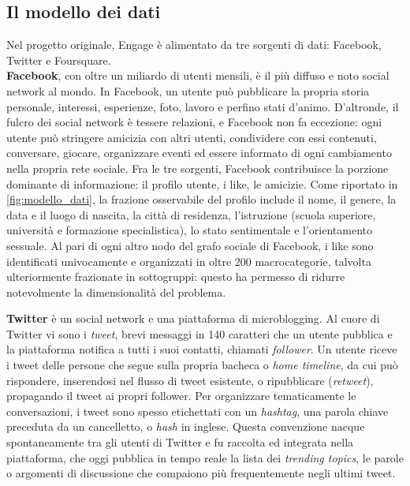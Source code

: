 \subsection{Il modello dei dati}
Nel progetto originale, Engage \`e alimentato da tre sorgenti di dati: Facebook, Twitter e Foursquare.\\
\textbf{Facebook}, con oltre un miliardo di utenti mensili, \`e il pi\`u diffuso e noto social network al mondo. In Facebook, un utente pu\`o pubblicare la propria storia personale, interessi, esperienze, foto, lavoro e perfino stati d'animo. D'altronde, il fulcro dei social network \`e tessere relazioni, e Facebook non fa eccezione: ogni utente pu\`o stringere amicizia con altri utenti, condividere con essi contenuti, conversare, giocare, organizzare eventi ed essere informato di ogni cambiamento nella propria rete sociale. Fra le tre sorgenti, Facebook contribuisce la porzione dominante di informazione: il profilo utente, i like, le amicizie. Come riportato in \autoref{fig:modello_dati}, la frazione osservabile del profilo include il nome, il genere, la data e il luogo di nascita, la citt\`a di residenza, l'istruzione (scuola superiore, universit\`a e formazione specialistica), lo stato sentimentale e l'orientamento sessuale. Al pari di ogni altro nodo del grafo sociale di Facebook, i like sono identificati univocamente e organizzati in oltre 200 macrocategorie, talvolta ulteriormente frazionate in sottogruppi: questo ha permesso di ridurre notevolmente la dimensionalit\`a del problema.

\textbf{Twitter} \`e un social network e una piattaforma di microblogging. Al cuore di Twitter vi sono i \textit{tweet}, brevi messaggi in 140 caratteri che un utente pubblica e la piattaforma notifica a tutti i suoi contatti, chiamati \textit{follower}. Un utente riceve i tweet delle persone che segue sulla propria bacheca o \textit{home timeline}, da cui pu\`o rispondere, inserendosi nel flusso di tweet esistente, o ripubblicare (\textit{retweet}), propagando il tweet ai propri follower. Per organizzare tematicamente le conversazioni, i tweet sono spesso etichettati con un \textit{hashtag}, una parola chiave preceduta da un cancelletto, o \textit{hash} in inglese. Questa convenzione nacque spontaneamente tra gli utenti di Twitter e fu raccolta ed integrata nella piattaforma, che oggi pubblica in tempo reale la lista dei \textit{trending topics}, le parole o argomenti di discussione che compaiono pi\`u frequentemente negli ultimi tweet.

